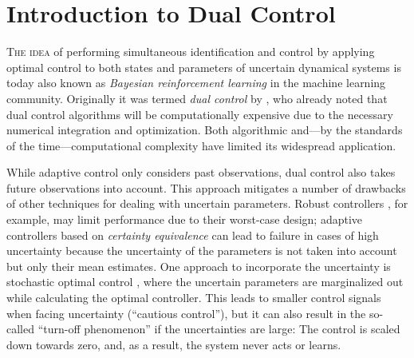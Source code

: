 \chapter{Introduction to Dual Control}
\label{ch:introduction-to-dual-control}

\lettrine{T}{he idea} of performing simultaneous identification and control by
applying optimal control to both states and parameters of uncertain dynamical
systems is today also known as \emph{Bayesian reinforcement learning}
\cite{Poupart.Vlassis.ea:2006:Analytic} in the machine learning community.
Originally it was termed \emph{dual control} by \textcite{Feldbaum:1960:Dual},
who already noted that dual control algorithms will be computationally expensive
due to the necessary numerical integration and optimization. Both algorithmic
and---by the standards of the time---computational complexity have limited its
widespread application.

While adaptive control only considers past observations, dual control also
takes future observations into account. This approach mitigates a number of
drawbacks of other techniques for dealing with uncertain parameters. Robust
controllers \cite{Zhou.Doyle:1998:Essentials}, for example, may limit
performance due to their worst-case design; adaptive controllers based on
\emph{certainty equivalence} \cite[]{Kumar.Varaiya:1986:Stochastic}
can lead to failure in cases of high uncertainty because the uncertainty of
the parameters is not taken into account but only their mean estimates. One
approach to incorporate the uncertainty is stochastic optimal control
\cite{Astrom:1970:Introduction}, where the uncertain parameters are marginalized
out while calculating the optimal controller. This leads to smaller control
signals when facing uncertainty (``cautious control''), but it can also result
in the so-called ``turn-off phenomenon'' \cite{Hughes.Jacobs:1974:Turn-off} if
the uncertainties are large: The control is scaled down towards zero, and, as a
result, the system never acts or learns.


